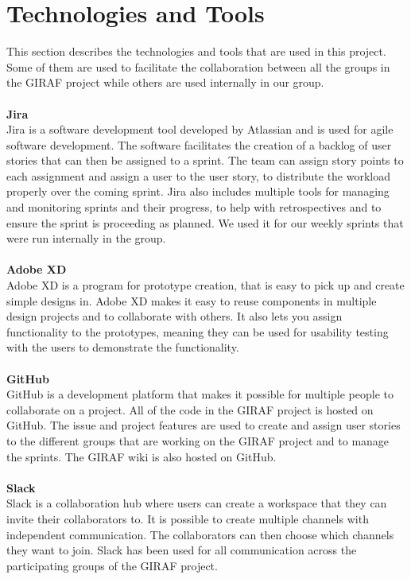 \section{Technologies and Tools}
This section describes the technologies and tools that are used in this project. 
Some of them are used to facilitate the collaboration between all the groups in the GIRAF project while others are used internally in our group.
\\\\
\textbf{Jira}\\
Jira is a software development tool developed by Atlassian and is used for agile software development.
The software facilitates the creation of a backlog of user stories that can then be assigned to a sprint.
The team can assign story points to each assignment and assign a user to the user story, to distribute the workload properly over the coming sprint.
Jira also includes multiple tools for managing and monitoring sprints and their progress, to help with retrospectives and to ensure the sprint is proceeding as planned.
We used it for our weekly sprints that were run internally in the group.
\\\\
\textbf{Adobe XD}\\
Adobe XD is a program for prototype creation, that is easy to pick up and create simple designs in.
Adobe XD makes it easy to reuse components in multiple design projects and to collaborate with others.
It also lets you assign functionality to the prototypes, meaning they can be used for usability testing with the users to demonstrate the functionality.
\\\\
\textbf{GitHub}\\
GitHub is a development platform that makes it possible for multiple people to collaborate on a project. 
All of the code in the GIRAF project is hosted on GitHub.
The issue and project features are used to create and assign user stories to the different groups that are working on the GIRAF project and to manage the sprints. 
The GIRAF wiki is also hosted on GitHub.
\\\\
\textbf{Slack}\\
Slack is a collaboration hub where users can create a workspace that they can invite their collaborators to.
It is possible to create multiple channels with independent communication. 
The collaborators can then choose which channels they want to join.
Slack has been used for all communication across the participating groups of the GIRAF project.
